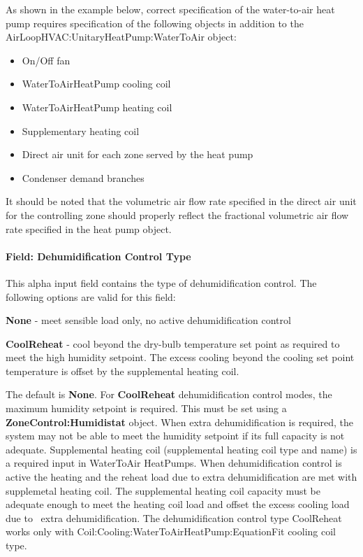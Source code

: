 As shown in the example below, correct specification of the water-to-air heat pump requires specification of the following objects in addition to the AirLoopHVAC:UnitaryHeatPump:WaterToAir object:

\begin{itemize}
\item
  On/Off fan
\item
  WaterToAirHeatPump cooling coil
\item
  WaterToAirHeatPump heating coil
\item
  Supplementary heating coil
\item
  Direct air unit for each zone served by the heat pump
\item
  Condenser demand branches
\end{itemize}

It should be noted that the volumetric air flow rate specified in the direct air unit for the controlling zone should properly reflect the fractional volumetric air flow rate specified in the heat pump object.

\paragraph{Field: Dehumidification Control Type}\label{field-dehumidification-control-type-4-000}

This alpha input field contains the type of dehumidification control. The following options are valid for this field:

\textbf{None} - meet sensible load only, no active dehumidification control

\textbf{CoolReheat} - cool beyond the dry-bulb temperature set point as required to meet the high humidity setpoint. The excess cooling beyond the cooling set point temperature is offset by the supplemental heating coil.

The default is \textbf{None}. For \textbf{CoolReheat} dehumidification control modes, the maximum humidity setpoint is required. This must be set using a \textbf{ZoneControl:Humidistat} object. When extra dehumidification is required, the system may not be able to meet the humidity setpoint if its full capacity is not adequate. Supplemental heating coil (supplemental heating coil type and name) is a required input in WaterToAir HeatPumps. When dehumidification control is active the heating and the reheat load due to extra dehumidification are met with supplemetal heating coil. The supplemental heating coil capacity must be adequate enough to meet the heating coil load and offset the excess cooling load due to~ extra dehumidification. The dehumidification control type CoolReheat works only with Coil:Cooling:WaterToAirHeatPump:EquationFit cooling coil type.

